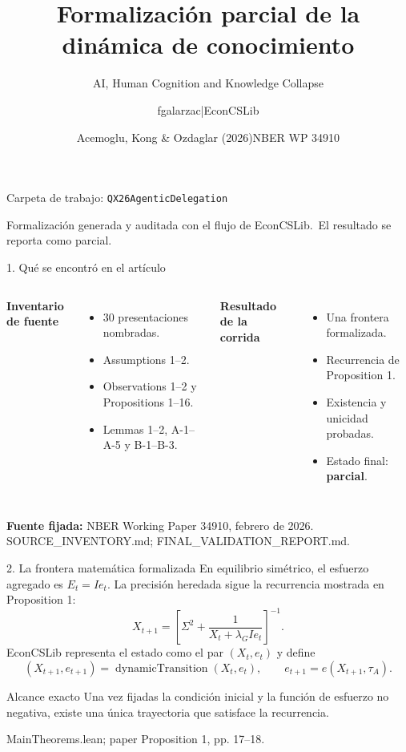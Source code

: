\documentclass[aspectratio=169,10pt]{beamer}
\title{Formalización parcial de la dinámica de conocimiento}
\subtitle{AI, Human Cognition and Knowledge Collapse}
\author{fgalarzac\quad |\quad EconCSLib}
\date{Acemoglu, Kong \& Ozdaglar (2026)\quad NBER WP 34910}
\newcommand{\src}[1]{\vfill{\tiny\color{gray}#1}}
\begin{document}
\begin{frame}[plain]
  \titlepage
  \centering
  \small Carpeta de trabajo: \texttt{QX26AgenticDelegation}
  \medskip

  \scriptsize Formalización generada y auditada con el flujo de EconCSLib.\
  El resultado se reporta como parcial.
\end{frame}

\begin{frame}{1. Qué se encontró en el artículo}
  \begin{columns}[T]
    \textbf{Inventario de fuente}
    \begin{itemize}
      \item 30 presentaciones nombradas.
      \item Assumptions 1--2.
      \item Observations 1--2 y Propositions 1--16.
      \item Lemmas 1--2, A-1--A-5 y B-1--B-3.
    \end{itemize}
    \textbf{Resultado de la corrida}
    \begin{itemize}
      \item Una frontera formalizada.
      \item Recurrencia de Proposition 1.
      \item Existencia y unicidad probadas.
      \item Estado final: \textbf{parcial}.
    \end{itemize}
  \end{columns}
  \medskip
  \textbf{Fuente fijada:} NBER Working Paper 34910, febrero de 2026.
  \src{SOURCE\_INVENTORY.md; FINAL\_VALIDATION\_REPORT.md.}
\end{frame}

\begin{frame}{2. La frontera matemática formalizada}
  En equilibrio simétrico, el esfuerzo agregado es $E_t=I e_t$. La precisión
  heredada sigue la recurrencia mostrada en Proposition 1:
  \[
    X_{t+1}
      =\left[\Sigma^2+
        \frac{1}{X_t+\lambda_G I e_t}\right]^{-1}.
  \]
  EconCSLib representa el estado como el par $(X_t,e_t)$ y define
  \[
    (X_{t+1},e_{t+1})
      =\operatorname{dynamicTransition}(X_t,e_t),
      \qquad e_{t+1}=e(X_{t+1},\tau_A).
  \]
  \begin{block}{Alcance exacto}
    Una vez fijadas la condición inicial y la función de esfuerzo no negativa,
    existe una única trayectoria que satisface la recurrencia.
  \end{block}
  \src{MainTheorems.lean; paper Proposition 1, pp. 17--18.}
\end{frame}
\end{document}
